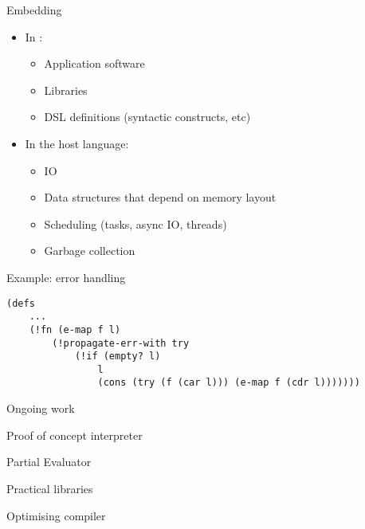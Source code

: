 \begin{frame}[fragile]{Embedding}
\begin{itemize}
    \item In \lang:
        \begin{itemize}
            \item Application software
            \item Libraries
            \item DSL definitions (syntactic constructs, etc)
        \end{itemize}
    \item In the host language:
        \begin{itemize}
            \item IO
            \item Data structures that depend on memory layout
            \item Scheduling (tasks, async IO, threads)
            \item Garbage collection
        \end{itemize}
\end{itemize}
\end{frame}

\begin{frame}[fragile]{Example: error handling}

\begin{verbatim}
(defs
    ...
    (!fn (e-map f l)
        (!propagate-err-with try
            (!if (empty? l)
                l
                (cons (try (f (car l))) (e-map f (cdr l)))))))
\end{verbatim}

\end{frame}

\begin{frame}[fragile]{Ongoing work}
\begin{todolist}
  \item[\done] Proof of concept interpreter
  \item Partial Evaluator
  \item Practical libraries
  \item Optimising compiler
\end{todolist}
\end{frame}


